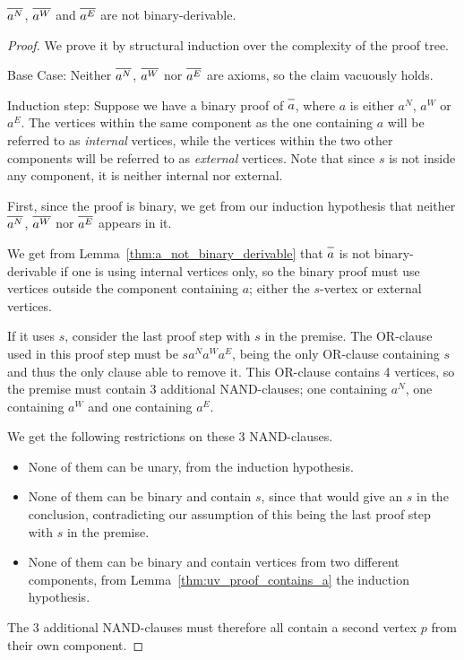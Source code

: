 \begin{lemma}
  $\ol{a^N}$, $\ol{a^W}$ and $\ol{a^E}$ are not binary-derivable.
  \label{thm:non_binary_derivable_a}
\end{lemma}
\begin{proof}
  We prove it by structural induction over the complexity of the proof tree.

  Base Case:
  Neither $\ol{a^N}$, $\ol{a^W}$ nor $\ol{a^E}$ are axioms, so the claim vacuously holds.

  Induction step:
  Suppose we have a binary proof of $\ol{a}$, where $a$ is either $a^N$, $a^W$ or $a^E$.
  The vertices within the same component as the one containing $a$ will be referred to as \textit{internal} vertices, while the vertices within the two other components will be referred to as \textit{external} vertices.
  Note that since $s$ is not inside any component, it is neither internal nor external.

  First, since the proof is binary, we get from our induction hypothesis that neither $\ol{a^N}$, $\ol{a^W}$ nor $\ol{a^E}$ appears in it.

  We get from Lemma~\ref{thm:a_not_binary_derivable} that $\ol{a}$ is not binary-derivable if one is using internal vertices only, so the binary proof must use vertices outside the component containing $a$; either the $s$-vertex or external vertices.

  If it uses $s$, consider the last proof step with $s$ in the premise.
  The OR-clause used in this proof step must be $sa^Na^Wa^E$, being the only OR-clause containing $s$ and thus the only clause able to remove it.
  This OR-clause contains 4 vertices, so the premise must contain 3 additional NAND-clauses;
  one containing $a^N$, one containing $a^W$ and one containing $a^E$.

  We get the following restrictions on these 3 NAND-clauses.
  \begin{itemize}
    \item None of them can be unary, from the induction hypothesis.
    \item None of them can be binary and contain $s$, since that would give an $s$ in the conclusion, contradicting our assumption of this being the last proof step with $s$ in the premise.
    \item None of them can be binary and contain vertices from two different components, from Lemma~\ref{thm:uv_proof_contains_a} the induction hypothesis.
  \end{itemize}
  The 3 additional NAND-clauses must therefore all contain a second vertex $p$ from their own component.


\end{proof}

